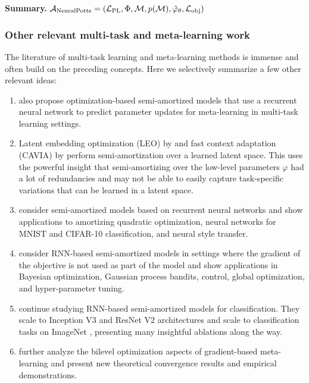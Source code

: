 \documentclass[twoside,11pt]{article}
\begin{document}
\textbf{Summary.} ${\mathcal{A}}_{\rm NeuralPotts}=({\mathcal{L}}_{\rm PL}, \Phi, {\mathcal{M}}, p({\mathcal{M}}), \hat \varphi_\theta, {\mathcal{L}}_{\rm obj})$

\subsubsection{Other relevant multi-task and meta-learning work}
The literature of multi-task learning and meta-learning
methods is immense and often build on the preceding concepts.
Here we selectively summarize a few other relevant ideas:

\begin{enumerate}
\item \citet{ravi2016optimization} also propose optimization-based
  semi-amortized models that use a recurrent neural network
  to predict parameter updates for meta-learning in multi-task
  learning settings.
\item Latent embedding optimization (LEO) by \citet{rusu2018meta}
  and fast context adaptation (CAVIA) by \citet{zintgraf2019fast}
  perform semi-amortization over a learned latent space.
  This uses the powerful insight that semi-amortizing over
  the low-level parameters $\varphi$ had a lot of redundancies
  and may not be able to easily capture task-specific
  variations that can be learned in a latent space.
\item \citet{andrychowicz2016learning}
  consider semi-amortized models based on recurrent neural networks
  and show applications to amortizing quadratic optimization,
  neural networks for MNIST and CIFAR-10 classification,
  and neural style transfer.
\item \citet{chen2017learning} consider RNN-based semi-amortized models
  in settings where the gradient of the objective is not
  used as part of the model and show applications in Bayesian
  optimization, Gaussian process bandits, control, global optimization,
  and hyper-parameter tuning.
\item \citet{wichrowska2017learned} continue studying
  RNN-based semi-amortized models for classification.
  They scale to Inception V3 \citep{szegedy2016rethinking}
  and ResNet V2 \citep{he2016identity} architectures
  and scale to classification tasks on ImageNet
  \citep{russakovsky2015imagenet}, presenting many
  insightful ablations along the way.
\item \citet{franceschi2018bilevel} further analyze the
  bilevel optimization aspects of gradient-based meta-learning
  and present new theoretical convergence results and
  empirical demonstrations.

\end{enumerate}
\end{document}
